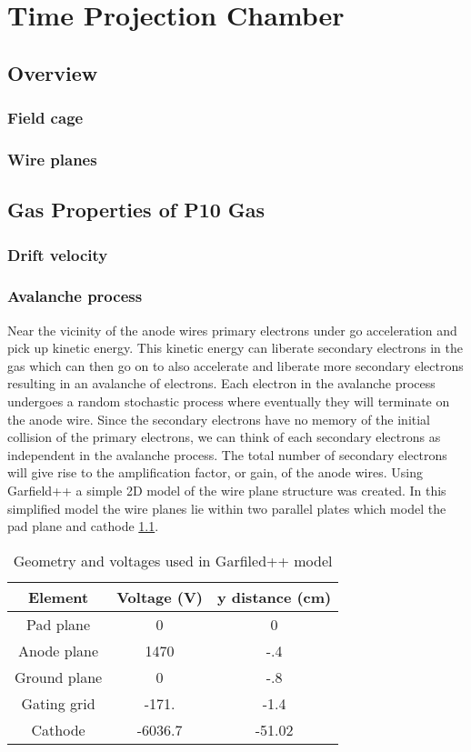 \chapter{Time Projection Chamber}
\section{Overview}

\subsection{Field cage}

\subsection{Wire planes}

\section{Gas Properties of P10 Gas}

\subsection{Drift velocity}

\subsection{Avalanche process}

Near the vicinity of the anode wires primary electrons under go acceleration and pick up kinetic energy. This kinetic energy can liberate secondary electrons in the gas which can then go on to also accelerate and liberate more secondary electrons resulting in an avalanche of electrons. Each electron in the avalanche process undergoes a random stochastic process where eventually they will terminate on the anode wire. Since the secondary electrons have no memory of the initial collision of the primary electrons, we can think of each secondary electrons as independent in the avalanche process. The total number of secondary electrons will give rise to the amplification factor, or gain, of the anode wires. 
Using Garfield++ a simple 2D model of the wire plane structure was created. In this simplified model the wire planes lie within two parallel plates which model the pad plane and cathode \ref{table:gar_model}.
\begin{table}[h!]
\centering
\begin{tabular}{|c|c|c|}
\hline
 Element & Voltage (V) & y distance (cm) \\
\hline
Pad plane    & 0 & 0 \\
\hline
Anode plane  & 1470 & -.4 \\
\hline
Ground plane & 0 & -.8 \\
\hline
Gating grid  & -171. & -1.4 \\
\hline
Cathode  & -6036.7 & -51.02 \\
\hline
\end{tabular}
\caption{Geometry and voltages used in Garfiled++ model}
\label{table:gar_model}
\end{table}

